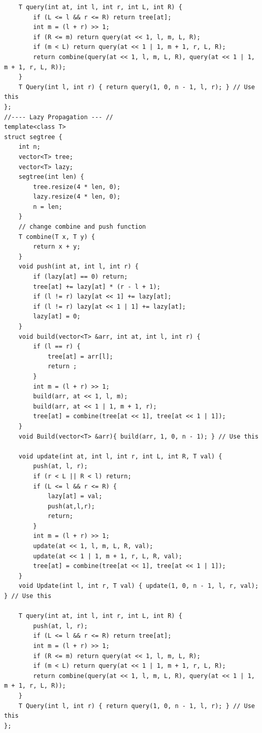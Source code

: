 \documentclass[a4paper,11pt,oneside]{article}
\begin{document}
\begin{multicols*}{\COLS}
\begin{lstlisting}
    T query(int at, int l, int r, int L, int R) {
        if (L <= l && r <= R) return tree[at];
        int m = (l + r) >> 1;
        if (R <= m) return query(at << 1, l, m, L, R);
        if (m < L) return query(at << 1 | 1, m + 1, r, L, R); 
        return combine(query(at << 1, l, m, L, R), query(at << 1 | 1, m + 1, r, L, R));
    }
    T Query(int l, int r) { return query(1, 0, n - 1, l, r); } // Use this
};
//---- Lazy Propagation --- // 
template<class T>
struct segtree {
    int n;
    vector<T> tree;
    vector<T> lazy;
    segtree(int len) {
        tree.resize(4 * len, 0);
        lazy.resize(4 * len, 0);
        n = len;
    }
    // change combine and push function
    T combine(T x, T y) {
        return x + y;
    }
    void push(int at, int l, int r) {
        if (lazy[at] == 0) return;
        tree[at] += lazy[at] * (r - l + 1);
        if (l != r) lazy[at << 1] += lazy[at];
        if (l != r) lazy[at << 1 | 1] += lazy[at];
        lazy[at] = 0;
    }
    void build(vector<T> &arr, int at, int l, int r) {
        if (l == r) {
            tree[at] = arr[l];
            return ;
        }
        int m = (l + r) >> 1;
        build(arr, at << 1, l, m);
        build(arr, at << 1 | 1, m + 1, r);
        tree[at] = combine(tree[at << 1], tree[at << 1 | 1]);
    }
    void Build(vector<T> &arr){ build(arr, 1, 0, n - 1); } // Use this 

    void update(int at, int l, int r, int L, int R, T val) {
        push(at, l, r);
        if (r < L || R < l) return;
        if (L <= l && r <= R) {
            lazy[at] = val;
            push(at,l,r);
            return;
        }
        int m = (l + r) >> 1;
        update(at << 1, l, m, L, R, val);
        update(at << 1 | 1, m + 1, r, L, R, val);
        tree[at] = combine(tree[at << 1], tree[at << 1 | 1]);
    }
    void Update(int l, int r, T val) { update(1, 0, n - 1, l, r, val); } // Use this

    T query(int at, int l, int r, int L, int R) {
        push(at, l, r);
        if (L <= l && r <= R) return tree[at];
        int m = (l + r) >> 1;
        if (R <= m) return query(at << 1, l, m, L, R);
        if (m < L) return query(at << 1 | 1, m + 1, r, L, R); 
        return combine(query(at << 1, l, m, L, R), query(at << 1 | 1, m + 1, r, L, R));
    }
    T Query(int l, int r) { return query(1, 0, n - 1, l, r); } // Use this
};
\end{lstlisting}


\end{multicols*}
\end{document}
